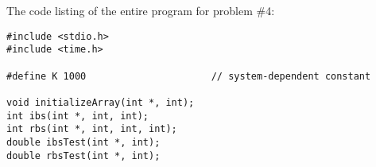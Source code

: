 \documentclass{article}
\begin{document}
\paragraph{}\
\paragraph{}\
\paragraph{}\
\paragraph{}\
\paragraph{}\
\paragraph{}\
\paragraph{}\
\paragraph{}\

		\rmfamily\
		
		\noindent The code listing of the entire program for problem \#4:
		\begin{verbatim}
#include <stdio.h>
#include <time.h>

#define K 1000                      // system-dependent constant

void initializeArray(int *, int);
int ibs(int *, int, int);
int rbs(int *, int, int, int);
double ibsTest(int *, int);
double rbsTest(int *, int);

		\end{verbatim}


\paragraph{}\
\paragraph{}\
\paragraph{}\
\end{document}
